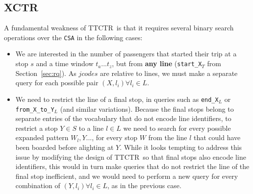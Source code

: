 \documentclass[runningheads]{llncs}
\newcommand{\ctr}{XCTR}
\newcommand{\ttctr}{TTCTR}
\begin{document}
\subsection{\ctr}
\label{sec:ctr}
A fundamental weakness of \ttctr~is that it requires several binary search operations over the \texttt{CSA} in the following cases:
\begin{itemize}
    \item We are interested in the number of passengers that started their trip at a stop $s$ and a time window $t_a...t_z$, but from \textbf{any line} (\texttt{start\_X$_{T}$} from Section~\ref{sec:rq}). As $jcodes$ are relative to lines, we must make a separate query for each possible pair $(X, l_i) \forall l_i \in L$.
    \item We need to restrict the line of a final stop, in queries such as \texttt{end\_X$_{L}$} or \texttt{from\_X\_to\_Y$_{L}$} (and similar variations). Because the final stops belong to separate entries of the vocabulary that do not encode line identifiers, to restrict a stop $Y\in S$ to a line $l\in L$ we need to search for every possible expanded pattern $W_l,Y...$, for every stop $W$ from the line $l$ that could have been boarded before alighting at $Y$. While it looks tempting to address this issue by modifying the design of \ttctr~so that final stops also encode line identifiers, this would in turn make queries that do not restrict the line of the final stop inefficient, and we would need to perform a new query for every combination of $(Y, l_i) \forall l_i \in L$, as in the previous case. 
\end{itemize}
\end{document}
